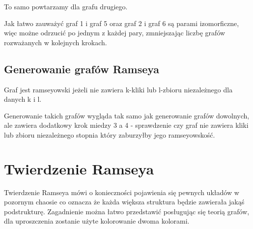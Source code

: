 \documentclass[11pt]{article}
\begin{document}
 \vspace{15mm}
 \vspace{15mm} 

To samo powtarzamy dla grafu drugiego. 

Jak łatwo zauważyć graf 1 i graf 5 oraz graf 2 i graf 6 są parami izomorficzne, więc możne odrzucić po jednym z każdej pary, zmniejszając liczbę grafów rozważanych w kolejnych krokach.  

   \subsection{Generowanie grafów Ramseya}
   Graf jest ramseyowski jeżeli nie zawiera k-kliki lub l-zbioru niezależnego dla danych k i l. 

   Generowanie takich grafów wygląda tak samo jak generowanie grafów dowolnych, 
   ale zawiera dodatkowy krok miedzy 3 a 4 - sprawdzenie czy graf nie zawiera kliki lub zbioru niezależnego stopnia który zaburzyłby jego ramseyowskość.  

\section{Twierdzenie Ramseya}

Twierdzenie Ramseya mówi o konieczności pojawienia się pewnych układów w pozornym chaosie co oznacza że każda większa struktura będzie zawierała jakąś podstrukturę. Zagadnienie można łatwo przedstawić posługując się teorią grafów, dla uproszczenia zostanie użyte kolorowanie dwoma kolorami.
\end{document}
